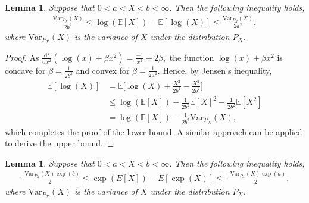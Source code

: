 \documentclass{article}
\theoremstyle{plain}
\theoremstyle{plain}
\newtheorem{lemma}[theorem]{Lemma}
\theoremstyle{definition}
\theoremstyle{remark}
\newcommand{\mrd}{\mathrm{d}}
\newcommand{\var}{\mathrm{Var}}
\newcommand{\mbE}{\mathbb{E}}
\begin{document}

\begin{lemma}\label{lem:jensen_cap_ln}
Suppose that $0<a <X<b < \infty$. Then the following inequality holds,
\begin{equation*} 
    \begin{split}
       \frac{\var_{P_X}(X)}{2b^2}\leq  \log(\mbE[X])-\mbE[\log(X)]\leq \frac{\var_{P_X}(X)}{2a^2},
    \end{split}
\end{equation*}
where $\var_{P_X}(X)$ is the variance of $X$ under the distribution $P_X$.
\end{lemma}
\begin{proof}
   As $\frac{\mrd^2}{\mrd x^2}\left(\log(x) + \beta x^2\right) = \frac{-1}{x^2} + 2\beta,$ the function $\log(x) + \beta x^2$ is concave  for $\beta=\frac{1}{2b^2}$ and convex for $\beta=\frac{1}{2a^2}$.
Hence, by Jensen's inequality,  
    \[\begin{split}\mbE[\log(X)]
    &=
    \mbE\Big[\log(X)+\frac{X^2}{2b^2}-\frac{X^2}{2b^2}\Big]\\
    &\leq \log(\mbE[X])+\frac{1}{2b^2}\mbE[X]^2-\frac{1}{2b^2}\mbE[X^2]\\
    &=\log(\mbE[X])-\frac{1}{2b^2}\var_{P_X}(X),
    \end{split}\]
 which completes the proof of the lower bound. A similar approach can be applied to derive the upper bound.
\end{proof}
\begin{lemma}\label{lem: exp bound}
    Suppose that $0<a <X<b < \infty$. Then the following inequality holds,
\begin{equation*} 
    \begin{split}
     \frac{-\var_{P_X}(X)\exp(b)}{2}\leq \exp(E[X])-E[\exp(X)]\leq \frac{-\var_{P_X}(X)\exp(a)}{2},
    \end{split}
\end{equation*}
where $\var_{P_X}(X)$ is the variance of $X$ under the distribution $P_X$.
\end{lemma}
\end{document}
